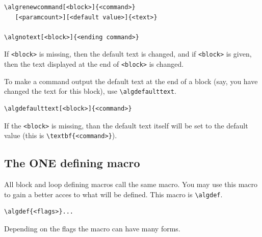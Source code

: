 \documentclass{article}
\begin{document}
\begin{minipage}[b]{0.5\linewidth}
\begin{minipage}[b]{0.5\linewidth}
\begin{minipage}[b]{0.5\linewidth}
\begin{minipage}[b]{0.5\linewidth}
\begin{minipage}[b]{0.5\linewidth}
\begin{minipage}[b]{0.5\linewidth}
\begin{minipage}[b]{0.5\linewidth}
\begin{verbatim}
\algrenewcommand[<block>]{<command>}
   [<paramcount>][<default value>]{<text>}

\algnotext[<block>]{<ending command>}
\end{verbatim}

If \verb:<block>: is missing, then the default text is changed, and if \verb:<block>: is given,
then the text displayed at the end of \verb:<block>: is changed.

To make a command output the default text at the end of a block (say, you have changed the text
for this block), use \verb:\algdefaulttext:.

\begin{verbatim}
\algdefaulttext[<block>]{<command>}
\end{verbatim}

If the \verb:<block>: is missing, than the default text itself will be set to the default value
(this is \verb:\textbf{<command>}:).

\subsection{The ONE defining macro}

All block and loop defining macros call the same macro. You may use this macro to gain a
better acces to what will be defined. This macro is \verb:\algdef:.

\begin{verbatim}
\algdef{<flags>}...
\end{verbatim}

Depending on the flags the macro can have many forms.


\end{minipage}
\end{minipage}
\end{minipage}
\end{minipage}
\end{minipage}
\end{minipage}
\end{minipage}
\end{document}
